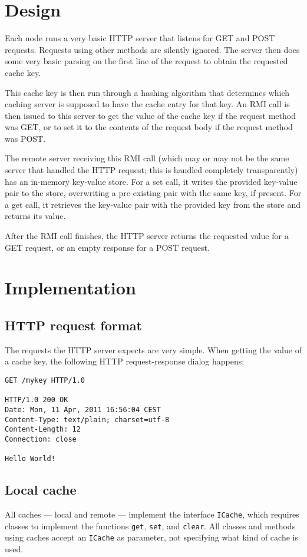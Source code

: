 \documentclass[11pt]{article}
\begin{document}
\section*{Design}
Each node runs a very basic HTTP server that listens for GET and POST requests. Requests using
other methods are silently ignored. The server then does some very basic parsing on the first line
of the request to obtain the requested cache key.

This cache key is then run through a hashing algorithm that determines which caching server is
supposed to have the cache entry for that key. An RMI call is then issued to this server to
get the value of the cache key if the request method was GET, or to set it to the contents
of the request body if the request method was POST.

The remote server receiving this RMI call (which may or may not be the same server that
handled the HTTP request; this is handled completely transparently) has an in-memory
key-value store. For a set call, it writes the provided key-value pair to the store,
overwriting a pre-existing pair with the same key, if present. For a get call, it
retrieves the key-value pair with the provided key from the store and returns its
value.

After the RMI call finishes, the HTTP server returns the requested value for a GET
request, or an empty response for a POST request.

\section*{Implementation}
\subsection*{HTTP request format}
The requests the HTTP server expects are very simple. When getting the value of a
cache key, the following HTTP request-response dialog happens:

\begin{lstlisting}
GET /mykey HTTP/1.0

HTTP/1.0 200 OK 
Date: Mon, 11 Apr, 2011 16:56:04 CEST
Content-Type: text/plain; charset=utf-8
Content-Length: 12
Connection: close

Hello World!
\end{lstlisting}

\subsection*{Local cache}
All caches --- local and remote --- implement the interface \texttt{ICache}, which requires classes to implement the functions \texttt{get}, \texttt{set}, and \texttt{clear}. All classes and methods using caches accept an \texttt{ICache} as parameter, not specifying what kind of cache is used.
\end{document}
